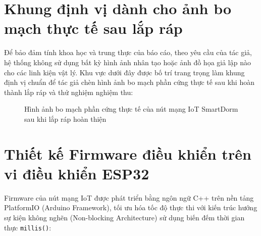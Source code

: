 \section{Khung định vị dành cho ảnh bo mạch thực tế sau lắp ráp}
\label{sec:khung_anh_thuc_te}

Để bảo đảm tính khoa học và trung thực của báo cáo, theo yêu cầu của tác giả, hệ thống không sử dụng bất kỳ hình ảnh nhân tạo hoặc ảnh đồ họa giả lập nào cho các linh kiện vật lý. Khu vực dưới đây được bố trí trang trọng làm khung định vị chuẩn để tác giả chèn hình ảnh bo mạch phần cứng thực tế sau khi hoàn thành lắp ráp và thử nghiệm nghiệm thu:

\begin{figure}[H]
\centering
{}
\caption{Hình ảnh bo mạch phần cứng thực tế của nút mạng IoT SmartDorm sau khi lắp ráp hoàn thiện}
\label{fig:anh_bo_mach_thuc_te}
\end{figure}

\section{Thiết kế Firmware điều khiển trên vi điều khiển ESP32}
\label{sec:firmware_esp32}

Firmware của nút mạng IoT được phát triển bằng ngôn ngữ C++ trên nền tảng PlatformIO (Arduino Framework), tối ưu hóa tốc độ thực thi với kiến trúc hướng sự kiện không nghẽn (Non-blocking Architecture) sử dụng biến đếm thời gian thực \texttt{millis()}:

